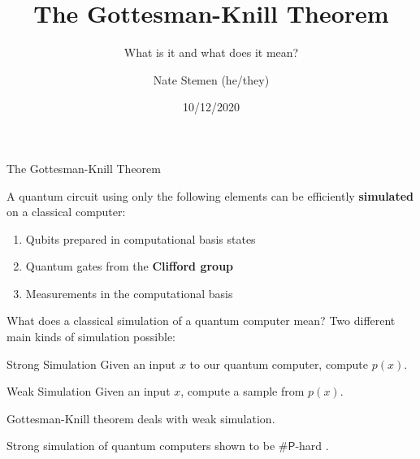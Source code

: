 \documentclass[11pt,aspectratio=1610]{beamer}
\title{The Gottesman-Knill Theorem}
\subtitle{What is it and what does it mean?}
\date{10/12/2020}
\author{Nate Stemen (he/they)}
\institute{QIC 710 Final Project}
\begin{document}
\maketitle

\begin{frame}{The Gottesman-Knill Theorem}
	\begin{theorem}
		A quantum circuit using only the following elements can be efficiently \textbf{simulated} on a classical computer:
		\begin{enumerate}
			\item Qubits prepared in computational basis states
			\item Quantum gates from the \textbf{Clifford group}
			\item Measurements in the computational basis
		\end{enumerate}
	\end{theorem}
\end{frame}

\begin{frame}{What does a classical simulation of a quantum computer mean?}
	Two different main kinds of simulation possible:\pause
	\begin{exampleblock}{Strong Simulation}
		Given an input $x$ to our quantum computer, compute $p(x)$.
	\end{exampleblock}\pause
	\begin{exampleblock}{Weak Simulation}
		Given an input $x$, compute a sample from $p(x)$.
	\end{exampleblock}\pause
	Gottesman-Knill theorem deals with weak simulation.

	Strong simulation of quantum computers shown to be $\#\bm{\mathsf{P}}$-hard \cite{nest}.
\end{frame}
\end{document}

